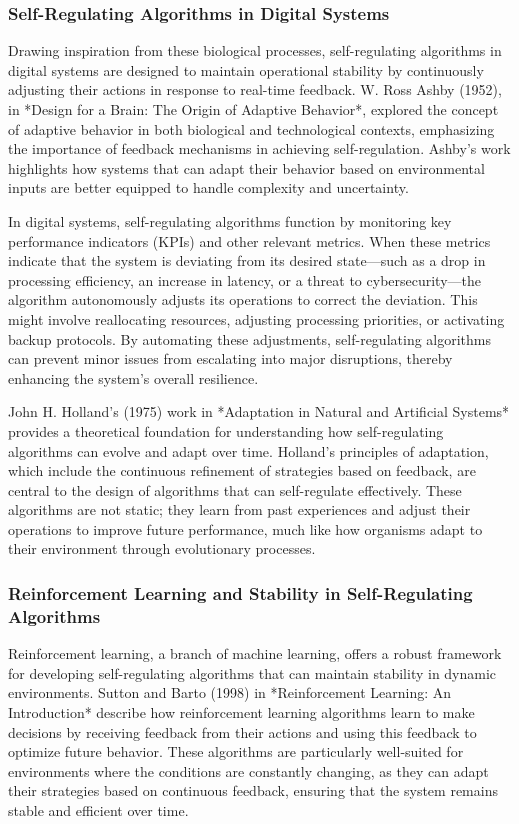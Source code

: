 \documentclass[12pt,twoside]{article}
\begin{document}
\subsubsection{Self-Regulating Algorithms in Digital Systems}

Drawing inspiration from these biological processes, self-regulating algorithms in digital systems are designed to maintain operational stability by continuously adjusting their actions in response to real-time feedback. W. Ross Ashby (1952), in *Design for a Brain: The Origin of Adaptive Behavior*, explored the concept of adaptive behavior in both biological and technological contexts, emphasizing the importance of feedback mechanisms in achieving self-regulation. Ashby’s work highlights how systems that can adapt their behavior based on environmental inputs are better equipped to handle complexity and uncertainty.

In digital systems, self-regulating algorithms function by monitoring key performance indicators (KPIs) and other relevant metrics. When these metrics indicate that the system is deviating from its desired state—such as a drop in processing efficiency, an increase in latency, or a threat to cybersecurity—the algorithm autonomously adjusts its operations to correct the deviation. This might involve reallocating resources, adjusting processing priorities, or activating backup protocols. By automating these adjustments, self-regulating algorithms can prevent minor issues from escalating into major disruptions, thereby enhancing the system's overall resilience.

John H. Holland’s (1975) work in *Adaptation in Natural and Artificial Systems* provides a theoretical foundation for understanding how self-regulating algorithms can evolve and adapt over time. Holland’s principles of adaptation, which include the continuous refinement of strategies based on feedback, are central to the design of algorithms that can self-regulate effectively. These algorithms are not static; they learn from past experiences and adjust their operations to improve future performance, much like how organisms adapt to their environment through evolutionary processes.

\subsubsection{Reinforcement Learning and Stability in Self-Regulating Algorithms}

Reinforcement learning, a branch of machine learning, offers a robust framework for developing self-regulating algorithms that can maintain stability in dynamic environments. Sutton and Barto (1998) in *Reinforcement Learning: An Introduction* describe how reinforcement learning algorithms learn to make decisions by receiving feedback from their actions and using this feedback to optimize future behavior. These algorithms are particularly well-suited for environments where the conditions are constantly changing, as they can adapt their strategies based on continuous feedback, ensuring that the system remains stable and efficient over time.
\end{document}
